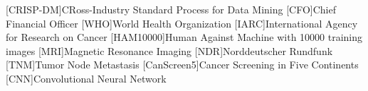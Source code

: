 \begin{acronym}[CRISP-DM]
[CRISP-DM]{CRoss-Industry Standard Process for Data Mining}
[CFO]{Chief Financial Officer}
[WHO]{World Health Organization}
[IARC]{International Agency for Research on Cancer}
[HAM10000]{Human Against Machine with 10000 training images}
[MRI]{Magnetic Resonance Imaging}
[NDR]{Norddeutscher Rundfunk}
[TNM]{Tumor Node Metastasis}
[CanScreen5]{Cancer Screening in Five Continents}
[CNN]{Convolutional Neural Network}
\end{acronym}